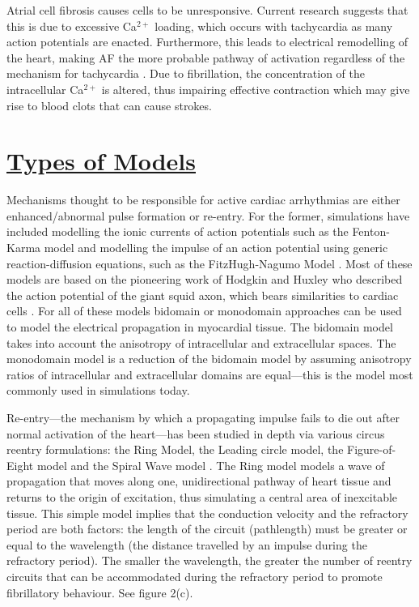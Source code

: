 \documentclass[twocolumn]{article}
\begin{document}
Atrial cell fibrosis causes cells to be unresponsive. Current research suggests that this is due to excessive Ca$^{2+}$ loading, which occurs with tachycardia as many action potentials are enacted. Furthermore, this leads to electrical remodelling of the heart, making AF the more probable pathway of activation regardless of the mechanism for tachycardia \cite{Nattel2}. Due to fibrillation, the concentration of the intracellular Ca$^{2+}$ is altered, thus impairing effective contraction which may give rise to blood clots that can cause strokes. %


\section{\textbf{\underline{Types of Models}}} %

Mechanisms thought to be responsible for active cardiac arrhythmias are either enhanced/abnormal pulse formation or re-entry. For the former, simulations have included modelling the ionic currents of action potentials such as the Fenton-Karma model \cite{Grandi} \cite{Fenton} and modelling the impulse of an action potential using generic reaction-diffusion equations, such as the FitzHugh-Nagumo Model \cite{FitzHugh}. Most of these models are based on the pioneering work of Hodgkin and Huxley who described the action potential of the giant squid axon, which bears similarities to cardiac cells \cite{Hodgkin}. %
 For all of these models bidomain or monodomain approaches can be used to model the electrical propagation in myocardial tissue. %
  The bidomain model takes into account the anisotropy of intracellular and extracellular spaces. The monodomain model is a reduction of the bidomain model by assuming anisotropy ratios of intracellular and extracellular domains are equal---this is the model most commonly used in simulations today.%

Re-entry---the mechanism by which a propagating impulse fails to die out after normal activation of the heart---has been studied in depth via various circus reentry formulations: the Ring Model, the Leading circle model, the Figure-of-Eight model and the Spiral Wave model \cite{Antze} \cite{Tusscher}. The Ring model models a wave of propagation that moves along one, unidirectional pathway of heart tissue and returns to the origin of excitation, thus simulating a central area of inexcitable tissue. This simple model implies that the conduction velocity and the refractory period are both factors: the length of the circuit (pathlength) must be greater or equal to the wavelength (the distance travelled by an impulse during the refractory period). The smaller the wavelength, the greater the number of reentry circuits that can be accommodated during the refractory period to promote fibrillatory behaviour. See figure 2(c).
\end{document}
